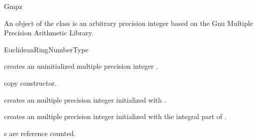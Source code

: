 \ccDefGlobalScope{}
\begin{ccRefClass} {Gmpz}
\label{Gmpz}

\ccDefinition

An object of the class  is an arbitrary precision integer 
based on the {\sc Gnu} Multiple Precision Arithmetic Library. 


\ccIsModel
EuclideanRingNumberType

\ccCreation
{}

             {creates an uninitialized multiple precision integer \ccVar.}

\ccHidden {}
            {copy constructor.}

            {creates an multiple precision integer initialized with
             .}

            {creates an multiple precision integer initialized with
             the integral part of .}


\ccImplementation
{}s are reference counted.

\end{ccRefClass} 
